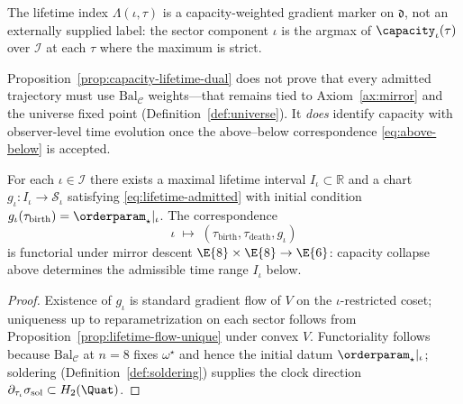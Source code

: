 \begin{corollary}\label{cor:iota-lambda}
The lifetime index $\Lambda(\iota,\tau)$ is a capacity-weighted gradient marker
on $\mathfrak{d}$, not an externally supplied label: the sector component
$\iota$ is the argmax of $\capacity_\iota(\tau)$ over $\mathcal{I}$ at each
$\tau$ where the maximum is strict.
\end{corollary}

\begin{remark}
Proposition~\ref{prop:capacity-lifetime-dual} does not prove that every
admitted trajectory must use $\mathrm{Bal}_{\mathcal{C}}$ weights---that
remains tied to Axiom~\ref{ax:mirror} and the universe fixed point
(Definition~\ref{def:universe}). It \emph{does} identify capacity with
observer-level time evolution once the above--below correspondence
\eqref{eq:above-below} is accepted.
\end{remark}

\begin{theorem}\label{thm:index-lifetime}
For each $\iota\in\mathcal{I}$ there exists a maximal lifetime interval
$I_\iota\subset\mathbb{R}$ and a chart $g_\iota:I_\iota\to\mathcal{S}_\iota$
satisfying \eqref{eq:lifetime-admitted} with initial condition
$g_\iota(\tau_{\mathrm{birth}})=\orderparam_\star|_\iota$.
The correspondence
\begin{equation}\label{eq:index-lifetime-bij}
  \iota \;\longmapsto\; (\tau_\mathrm{birth},\tau_\mathrm{death},g_\iota)
\end{equation}
is functorial under mirror descent $\E{8}\times\E{8}\to\E{6}$: capacity
collapse above determines the admissible time range $I_\iota$ below.
\end{theorem}

\begin{proof}
Existence of $g_\iota$ is standard gradient flow of $V$ on the
$\iota$-restricted coset; uniqueness up to reparametrization on each sector
follows from Proposition~\ref{prop:lifetime-flow-unique} under convex $V$.
Functoriality follows because
$\mathrm{Bal}_{\mathcal{C}}$ at $n=8$ fixes $\omega^\star$ and hence the
initial datum $\orderparam_\star|_\iota$; soldering
(Definition~\ref{def:soldering}) supplies the clock direction
$\partial_{\tau_\iota}\sigma_{\mathrm{sol}}\subset H_2(\Quat)$.
\end{proof}

